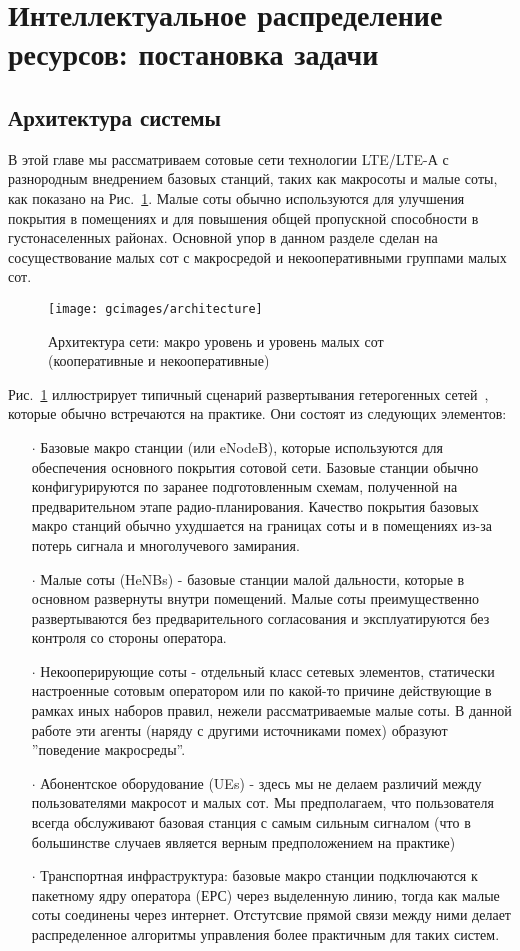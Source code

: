 \section{Интеллектуальное распределение ресурсов: постановка задачи}
\subsection{Архитектура системы}
В этой главе мы рассматриваем сотовые сети технологии LTE/LTE-А с разнородным внедрением базовых станций, таких как макросоты и малые соты, как показано на Рис.~\ref{fig:architecture}. Малые соты обычно используются для улучшения покрытия в помещениях и для повышения общей пропускной способности в густонаселенных районах. Основной упор в данном разделе сделан на сосуществование малых сот с макросредой и некооперативными группами малых сот.

\begin{figure}[]
    \centering
    \texttt{[image: gcimages/architecture]}
    \caption{Архитектура сети: макро уровень и уровень малых сот (кооперативные и некооперативные)}
    \label{fig:architecture}
\end{figure}

Рис.~\ref{fig:architecture} иллюстрирует типичный сценарий развертывания гетерогенных сетей~\cite{6824744}, которые обычно встречаются на практике. Они состоят из следующих элементов:

\begin{itemize}
\item[$\cdot$] Базовые макро станции (или eNodeB), которые используются для обеспечения основного покрытия сотовой сети. Базовые станции обычно конфигурируются по заранее подготовленным схемам, полученной на предварительном этапе радио-планирования. Качество покрытия базовых макро станций обычно ухудшается на границах соты и в помещениях из-за потерь сигнала и многолучевого замирания. 
\item[$\cdot$] Малые соты (HeNBs) - базовые станции малой дальности, которые в основном развернуты внутри помещений. Малые соты преимущественно развертываются без предварительного согласования и эксплуатируются без контроля со стороны оператора.
\item[$\cdot$] Некооперирующие соты - отдельный класс сетевых элементов, статически настроенные сотовым оператором или по какой-то причине действующие в рамках иных наборов правил, нежели рассматриваемые малые соты. В данной работе эти агенты (наряду с другими источниками помех) образуют ''поведение макросреды''.
\item[$\cdot$] Абонентское оборудование (UEs) - здесь мы не делаем различий между пользователями макросот и малых сот. Мы предполагаем, что пользователя всегда обслуживают базовая станция с самым сильным сигналом (что в большинстве случаев является верным предположением на практике)
\item[$\cdot$] Транспортная инфраструктура: базовые макро станции подключаются к пакетному ядру оператора (ЕРС) через выделенную линию, тогда как малые соты соединены через интернет. Отстутсвие прямой связи между ними делает распределенное алгоритмы управления более практичным для таких систем.
\end{itemize}

